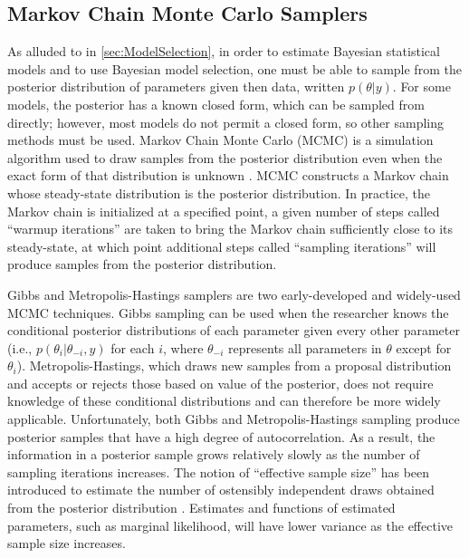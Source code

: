 \documentclass[twocolumn]{article}
\begin{document}
\subsection{Markov Chain Monte Carlo Samplers}

As alluded to in \cref{sec:ModelSelection}, in order to estimate Bayesian statistical models and to use Bayesian model selection, one must be able to sample from the posterior distribution of parameters given then data, written $p(\theta|y)$. For some models, the posterior has a known closed form, which can be sampled from directly; however, most models do not permit a closed form, so other sampling methods must be used. Markov Chain Monte Carlo (MCMC) is a simulation algorithm used to draw samples from the posterior distribution even when the exact form of that distribution is unknown \citep{GelfandSmith}. MCMC constructs a Markov chain whose steady-state distribution is the posterior distribution. In practice, the Markov chain is initialized at a specified point, a given number of steps called ``warmup iterations'' are taken to bring the Markov chain sufficiently close to its steady-state, at which point additional steps called ``sampling iterations'' will produce samples from the posterior distribution.

Gibbs and Metropolis-Hastings samplers are two early-developed and widely-used MCMC techniques. Gibbs sampling can be used when the researcher knows the conditional posterior distributions of each parameter given every other parameter (i.e., $p(\theta_i|\theta_{-i}, y)$ for each $i$, where $\theta_{-i}$ represents all parameters in $\theta$ except for $\theta_i$). Metropolis-Hastings, which draws new samples from a proposal distribution and accepts or rejects those based on value of the posterior, does not require knowledge of these conditional distributions and can therefore be more widely applicable. Unfortunately, both Gibbs and Metropolis-Hastings sampling produce posterior samples that have a high degree of autocorrelation. As a result, the information in a posterior sample grows relatively slowly as the number of sampling iterations increases. The notion of ``effective sample size'' has been introduced to estimate the number of ostensibly independent draws obtained from the posterior distribution \citep{Lenth}. Estimates and functions of estimated parameters, such as marginal likelihood, will have lower variance as the effective sample size increases.
\end{document}
